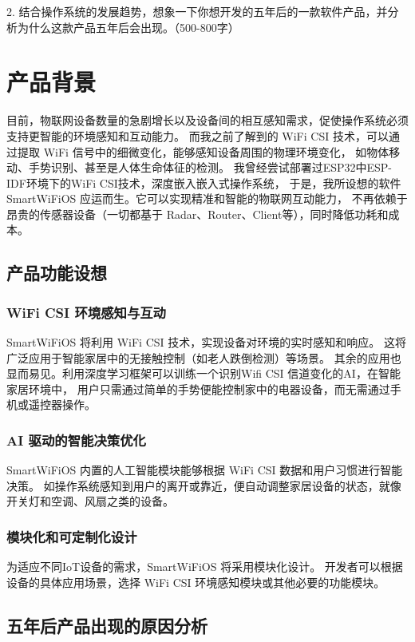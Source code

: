 \documentclass[UTF8]{homework}
\begin{document}
\begin{homeworkProblem}

2. 结合操作系统的发展趋势，想象一下你想开发的五年后的一款软件产品，并分析为什么这款产品五年后会出现。（500-800字） 

\section{产品背景}

目前，物联网设备数量的急剧增长以及设备间的相互感知需求，促使操作系统必须支持更智能的环境感知和互动能力。
而我之前了解到的 WiFi CSI 技术，可以通过提取 WiFi 信号中的细微变化，能够感知设备周围的物理环境变化，
如物体移动、手势识别、甚至是人体生命体征的检测。
我曾经尝试部署过ESP32中ESP-IDF环境下的WiFi CSI技术，深度嵌入嵌入式操作系统，
于是，我所设想的软件 SmartWiFiOS 应运而生。它可以实现精准和智能的物联网互动能力，
不再依赖于昂贵的传感器设备（一切都基于 Radar、Router、Client等），同时降低功耗和成本。

\subsection{产品功能设想}

\subsubsection{WiFi CSI 环境感知与互动}
SmartWiFiOS 将利用 WiFi CSI 技术，实现设备对环境的实时感知和响应。
这将广泛应用于智能家居中的无接触控制（如老人跌倒检测）等场景。
其余的应用也显而易见。利用深度学习框架可以训练一个识别Wifi CSI 信道变化的AI，在智能家居环境中，
用户只需通过简单的手势便能控制家中的电器设备，而无需通过手机或遥控器操作。

\subsubsection{AI 驱动的智能决策优化}
SmartWiFiOS 内置的人工智能模块能够根据 WiFi CSI 数据和用户习惯进行智能决策。
如操作系统感知到用户的离开或靠近，便自动调整家居设备的状态，就像开关灯和空调、风扇之类的设备。

\subsubsection{模块化和可定制化设计}
为适应不同IoT设备的需求，SmartWiFiOS 将采用模块化设计。
开发者可以根据设备的具体应用场景，选择 WiFi CSI 环境感知模块或其他必要的功能模块。

\subsection{五年后产品出现的原因分析}


\end{homeworkProblem}
\end{document}
